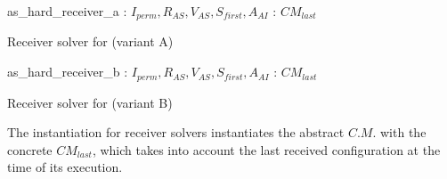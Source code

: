 \begin{algorithm}[h]
\dontprintsemicolon
\SetNoline
{}
   as\_hard\_receiver\_a\;
\algoindent{} : $I_{perm}, R_{AS}, V_{AS}, S_{first}, A_{AI}$ \; 
\algoindent{}: $CM_{last}$\;
\caption{Receiver solver for \CARRP{} (variant A)}\label{as:costas_receiver_a}
\end{algorithm}

\begin{algorithm}[h]
\dontprintsemicolon
\SetNoline
{}
   as\_hard\_receiver\_b\;
\algoindent{} : $I_{perm}, R_{AS}, V_{AS}, S_{first}, A_{AI}$ \; 
\algoindent{}: $CM_{last}$\;
\caption{Receiver solver for \CARRP{} (variant B)}\label{as:costas_receiver_b}
\end{algorithm}

The instantiation for receiver solvers instantiates the abstract \opch{} $C.M.$ with the concrete \opch{} $CM_{last}$, which takes into account the last received configuration at the time of its execution.

